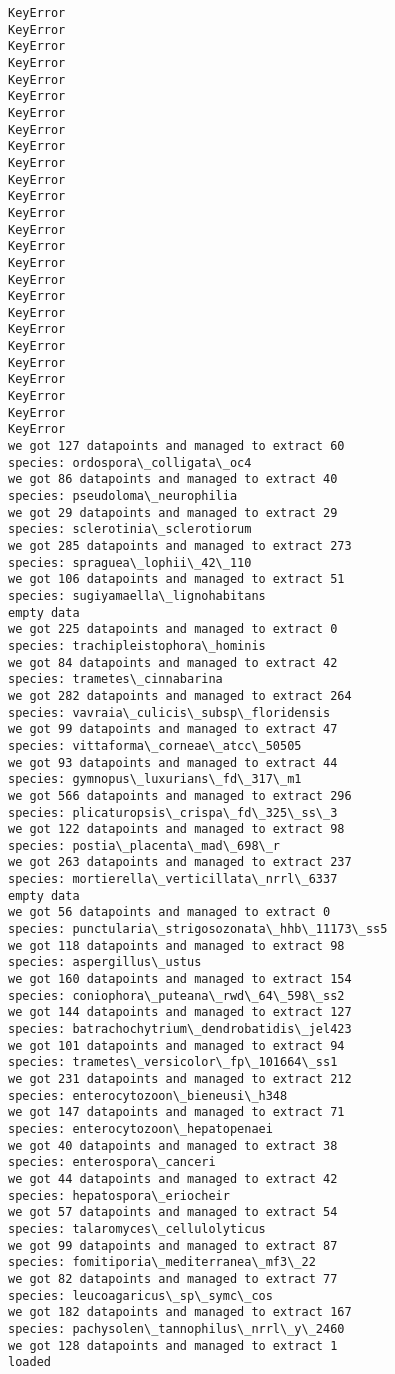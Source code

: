 \documentclass[11pt]{article}
\begin{document}
\begin{Verbatim}[commandchars=\\\{\}]
KeyError
KeyError
KeyError
KeyError
KeyError
KeyError
KeyError
KeyError
KeyError
KeyError
KeyError
KeyError
KeyError
KeyError
KeyError
KeyError
KeyError
KeyError
KeyError
KeyError
KeyError
KeyError
KeyError
KeyError
KeyError
KeyError
we got 127 datapoints and managed to extract 60
species: ordospora\_colligata\_oc4
we got 86 datapoints and managed to extract 40
species: pseudoloma\_neurophilia
we got 29 datapoints and managed to extract 29
species: sclerotinia\_sclerotiorum
we got 285 datapoints and managed to extract 273
species: spraguea\_lophii\_42\_110
we got 106 datapoints and managed to extract 51
species: sugiyamaella\_lignohabitans
empty data
we got 225 datapoints and managed to extract 0
species: trachipleistophora\_hominis
we got 84 datapoints and managed to extract 42
species: trametes\_cinnabarina
we got 282 datapoints and managed to extract 264
species: vavraia\_culicis\_subsp\_floridensis
we got 99 datapoints and managed to extract 47
species: vittaforma\_corneae\_atcc\_50505
we got 93 datapoints and managed to extract 44
species: gymnopus\_luxurians\_fd\_317\_m1
we got 566 datapoints and managed to extract 296
species: plicaturopsis\_crispa\_fd\_325\_ss\_3
we got 122 datapoints and managed to extract 98
species: postia\_placenta\_mad\_698\_r
we got 263 datapoints and managed to extract 237
species: mortierella\_verticillata\_nrrl\_6337
empty data
we got 56 datapoints and managed to extract 0
species: punctularia\_strigosozonata\_hhb\_11173\_ss5
we got 118 datapoints and managed to extract 98
species: aspergillus\_ustus
we got 160 datapoints and managed to extract 154
species: coniophora\_puteana\_rwd\_64\_598\_ss2
we got 144 datapoints and managed to extract 127
species: batrachochytrium\_dendrobatidis\_jel423
we got 101 datapoints and managed to extract 94
species: trametes\_versicolor\_fp\_101664\_ss1
we got 231 datapoints and managed to extract 212
species: enterocytozoon\_bieneusi\_h348
we got 147 datapoints and managed to extract 71
species: enterocytozoon\_hepatopenaei
we got 40 datapoints and managed to extract 38
species: enterospora\_canceri
we got 44 datapoints and managed to extract 42
species: hepatospora\_eriocheir
we got 57 datapoints and managed to extract 54
species: talaromyces\_cellulolyticus
we got 99 datapoints and managed to extract 87
species: fomitiporia\_mediterranea\_mf3\_22
we got 82 datapoints and managed to extract 77
species: leucoagaricus\_sp\_symc\_cos
we got 182 datapoints and managed to extract 167
species: pachysolen\_tannophilus\_nrrl\_y\_2460
we got 128 datapoints and managed to extract 1
loaded

    \end{Verbatim}
\end{document}
